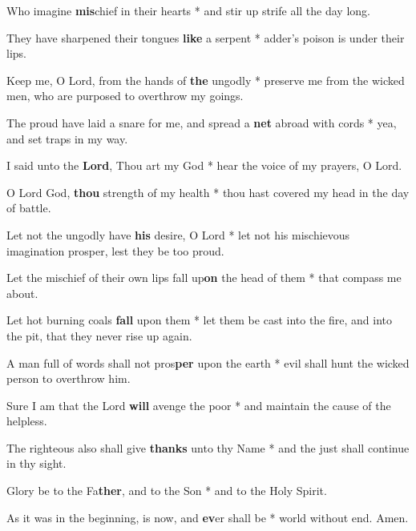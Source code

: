 \begin{multicols}{2}
	Who imagine \textbf{mis}chief in their hearts * and stir up strife all the day long.
	
	They have sharpened their tongues \textbf{like} a serpent * adder's poison is under their lips.
	
	Keep me, O Lord, from the hands of \textbf{the} ungodly * preserve me from the wicked men, who are purposed to overthrow my goings.
	
	The proud have laid a snare for me, and spread a \textbf{net} abroad with cords * yea, and set traps in my way.
	
	I said unto the \textbf{Lord}, Thou art my God * hear the voice of my prayers, O Lord.
	
	O Lord God, \textbf{thou} strength of my health * thou hast covered my head in the day of battle.
	
	Let not the ungodly have \textbf{his} desire, O Lord * let not his mischievous imagination prosper, lest they be too proud.
	
	Let the mischief of their own lips fall up\textbf{on} the head of them * that compass me about.
	
	Let hot burning coals \textbf{fall} upon them * let them be cast into the fire, and into the pit, that they never rise up again.
	
	A man full of words shall not pros\textbf{per} upon the earth * evil shall hunt the wicked person to overthrow him.
	
	Sure I am that the Lord \textbf{will} avenge the poor * and maintain the cause of the helpless.
	
	The righteous also shall give \textbf{thanks} unto thy Name * and the just shall continue in thy sight.
	
	Glory be to the Fa\textbf{ther}, and to the Son * and to the Holy Spirit.
	
	As it was in the beginning, is now, and \textbf{ev}er shall be * world without end. Amen.
\end{multicols}